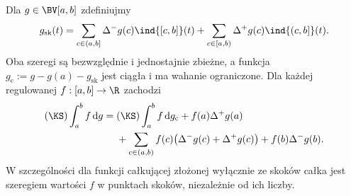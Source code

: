\begin{twierdzenie}
\label{tw:ks-bv-split}
Dla $g\in\BV[a,b]$ zdefiniujmy
\[
 g_{\mathrm{sk}}(t)=
 \sum_{c\in(a,b]}\Delta^-g(c)\ind{[c,b]}(t)
 +\sum_{c\in[a,b)}\Delta^+g(c)\ind{(c,b]}(t).
\]
Oba szeregi są bezwzględnie i jednostajnie zbieżne, a funkcja $g_{\mathrm c}:=g-g(a)-g_{\mathrm{sk}}$ jest ciągła i ma wahanie ograniczone. Dla każdej regulowanej $f:[a,b]\to\R$ zachodzi
\[
 \begin{aligned}
 (\KS)\int_a^b f\,\mathrm dg
 ={}&(\KS)\int_a^b f\,\mathrm dg_{\mathrm c}
 +f(a)\Delta^+g(a)\\
 &+\sum_{c\in(a,b)}f(c)\bigl(\Delta^-g(c)+\Delta^+g(c)\bigr)
 +f(b)\Delta^-g(b).
 \end{aligned}
\]
W szczególności dla funkcji całkującej złożonej wyłącznie ze skoków całka jest szeregiem wartości $f$ w punktach skoków, niezależnie od ich liczby.
\end{twierdzenie}
